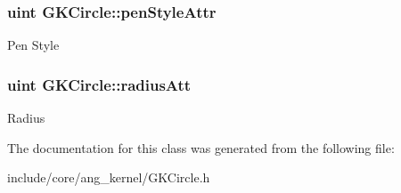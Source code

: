 \subsubsection[{\texorpdfstring{pen\+Style\+Attr}{penStyleAttr}}]{\setlength{\rightskip}{0pt plus 5cm}uint G\+K\+Circle\+::pen\+Style\+Attr\hspace{0.3cm}{\ttfamily [static]}}\hypertarget{classGKCircle_a856335ddf2a8a08cf9dc883756987792}{}\label{classGKCircle_a856335ddf2a8a08cf9dc883756987792}
Pen Style 
\subsubsection[{\texorpdfstring{radius\+Att}{radiusAtt}}]{\setlength{\rightskip}{0pt plus 5cm}uint G\+K\+Circle\+::radius\+Att\hspace{0.3cm}{\ttfamily [static]}}\hypertarget{classGKCircle_a270ea9935fb1b96d75e8a6e0fae0df58}{}\label{classGKCircle_a270ea9935fb1b96d75e8a6e0fae0df58}
Radius 

The documentation for this class was generated from the following file\+:\begin{DoxyCompactItemize}
\item 
include/core/ang\+\_\+kernel/G\+K\+Circle.\+h\end{DoxyCompactItemize}
